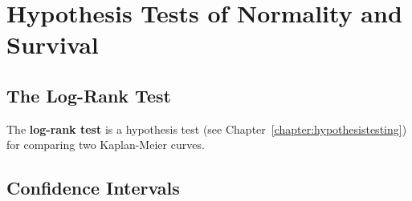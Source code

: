 \chapter{Hypothesis Tests of Normality and Survival \label{chapter:hypothesisii}}


\section{The Log-Rank Test}

The \textbf{log-rank test} is a hypothesis test (see Chapter~\ref{chapter:hypothesistesting}) for comparing two Kaplan-Meier curves. 

\section{Confidence Intervals}